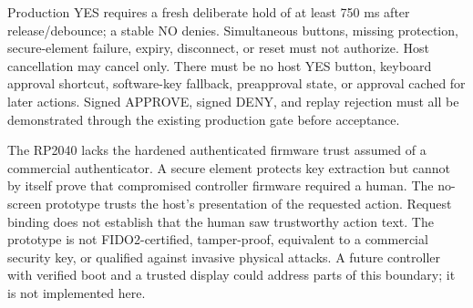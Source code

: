 \documentclass[journal]{IEEEtran}
\begin{document}
Production YES requires a fresh deliberate hold of at least 750 ms after release/debounce; a stable NO denies. Simultaneous buttons, missing protection, secure-element failure, expiry, disconnect, or reset must not authorize. Host cancellation may cancel only. There must be no host YES button, keyboard approval shortcut, software-key fallback, preapproval state, or approval cached for later actions. Signed APPROVE, signed DENY, and replay rejection must all be demonstrated through the existing production gate before acceptance.

The RP2040 lacks the hardened authenticated firmware trust assumed of a commercial authenticator. A secure element protects key extraction but cannot by itself prove that compromised controller firmware required a human. The no-screen prototype trusts the host's presentation of the requested action. Request binding does not establish that the human saw trustworthy action text. The prototype is not FIDO2-certified, tamper-proof, equivalent to a commercial security key, or qualified against invasive physical attacks. A future controller with verified boot and a trusted display could address parts of this boundary; it is not implemented here.
\end{document}
